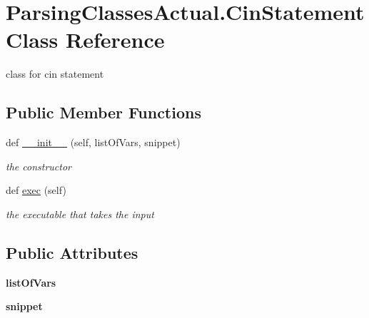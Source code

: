 \hypertarget{class_parsing_classes_actual_1_1_cin_statement}{}\section{Parsing\+Classes\+Actual.\+Cin\+Statement Class Reference}
\label{class_parsing_classes_actual_1_1_cin_statement}


class for cin statement  


\subsection*{Public Member Functions}
\begin{DoxyCompactItemize}
\item 
def \hyperlink{class_parsing_classes_actual_1_1_cin_statement_a33f554b86027e75caf334cdf023d357f}{\+\_\+\+\_\+init\+\_\+\+\_\+} (self, list\+Of\+Vars, snippet)
\begin{DoxyCompactList}\small\item\em the constructor \end{DoxyCompactList}\item 
\mbox{\label{class_parsing_classes_actual_1_1_cin_statement_a29fcb8d0a00fc0dc615ba23c0a9f6487}} 
def \hyperlink{class_parsing_classes_actual_1_1_cin_statement_a29fcb8d0a00fc0dc615ba23c0a9f6487}{exec} (self)
\begin{DoxyCompactList}\small\item\em the executable that takes the input \end{DoxyCompactList}\end{DoxyCompactItemize}
\subsection*{Public Attributes}
\begin{DoxyCompactItemize}
\item 
\mbox{\label{class_parsing_classes_actual_1_1_cin_statement_acaf94d5b9909e8ba0aca2b95f4a78864}} 
{\bfseries list\+Of\+Vars}
\item 
\mbox{\label{class_parsing_classes_actual_1_1_cin_statement_ac626232d88ffca05f7976db055dacb41}} 
{\bfseries snippet}
\end{DoxyCompactItemize}


